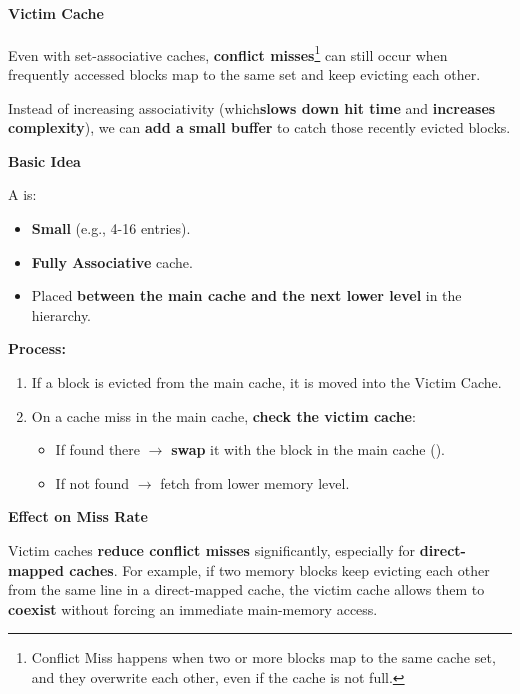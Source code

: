 \paragraph{Victim Cache}

Even with set-associative caches, \textbf{conflict misses}\footnote{Conflict Miss happens when two or more blocks map to the same cache set, and they overwrite each other, even if the cache is not full.} can still occur when frequently accessed blocks map to the same set and keep evicting each other.

\highspace
Instead of increasing associativity (which\textbf{slows down hit time} and \textbf{increases complexity}), we can \textbf{add a small buffer} to catch those recently evicted blocks.

\highspace
\begin{flushleft}
    \textcolor{Green3}{ \textbf{Basic Idea}}
\end{flushleft}
A  is:
\begin{itemize}
    \item \textbf{Small} (e.g., 4-16 entries).
    \item \textbf{Fully Associative} cache.
    \item Placed \textbf{between the main cache and the next lower level} in the hierarchy.
\end{itemize}
\textbf{Process:}
\begin{enumerate}
    \item If a block is evicted from the main cache, it is moved into the Victim Cache.
    \item On a cache miss in the main cache, \textbf{check the victim cache}:
    \begin{itemize}
        \item If found there $\rightarrow$ \textbf{swap} it with the block in the main cache ().
        \item If not found $\rightarrow$ fetch from lower memory level.
    \end{itemize}
\end{enumerate}

\begin{flushleft}
    \textcolor{Green3}{\faIcon{\speedIcon} \textbf{Effect on Miss Rate}}    
\end{flushleft}
Victim caches \textbf{reduce conflict misses} significantly, especially for \textbf{direct-mapped caches}. For example, if two memory blocks keep evicting each other from the same line in a direct-mapped cache, the victim cache allows them to \textbf{coexist} without forcing an immediate main-memory access.

